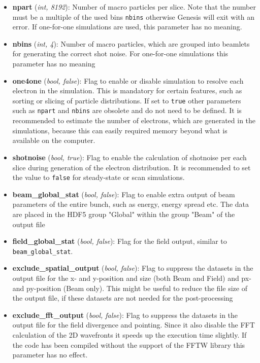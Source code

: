 \documentclass[12pt]{book}
\begin{document}
\begin{itemize}
\item {\bf npart} ({\it int, 8192}): Number of macro particles per slice. Note that the number must be a multiple of the used bins {\tt nbins} otherwise Genesis will exit with an error. If one-for-one simulations are used, this parameter has no meaning.

\item {\bf nbins} ({\it int, 4}): Number of macro particles, which are grouped into beamlets for generating the correct shot noise. For one-for-one simulations this parameter has no meaning

\item {\bf one4one} ({\it bool, false}): Flag to enable or disable simulation to resolve each electron in the simulation. This is mandatory for certain features, such as sorting or slicing of particle distributions. If set to {\tt true} other parameters such as {\tt npart} and {\tt nbins} are obsolete and do not need to be defined. It is recommended to estimate the number of electrons, which are generated in the simulations, because this can easily required memory beyond what is available on the computer.

\item {\bf shotnoise} ({\it bool, true}): Flag to enable the calculation of shotnoise per each slice during generation of the electron distribution. It is recommended to set the value to {\tt false} for steady-state or scan simulations.

\item {\bf beam\_global\_stat} ({\it bool, false}): Flag to enable extra output of beam parameters of the entire bunch, such as energy, energy spread etc. The data are placed in the HDF5 group "Global" within the group "Beam" of the output file

\item {\bf field\_global\_stat} ({\it bool, false}): Flag for the field output, similar to {\tt beam\_global\_stat}.

\item {\bf exclude\_spatial\_output} ({\it bool, false}): Flag to suppress the datasets in the output file for the x- and y-position and size (both Beam and Field) and px- and py-position (Beam only). This might be useful to reduce the file size of the output file, if these datasets are not needed for the post-processing
 
\item {\bf exclude\_fft\_output} ({\it bool, false}): Flag to suppress the datasets in the output file for the field divergence and pointing. Since it also disable the FFT calculation of the 2D wavefronts it speeds up the execution time slightly. If the code has been compiled without the support of the FFTW library this parameter has no effect.


\end{itemize}
\end{document}
